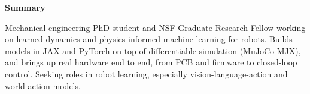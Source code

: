 \begin{center}
    \textbf{Summary}
\end{center}

Mechanical engineering PhD student and NSF Graduate Research Fellow working on learned dynamics and physics-informed machine learning for robots. Builds models in JAX and PyTorch on top of differentiable simulation (MuJoCo MJX), and brings up real hardware end to end, from PCB and firmware to closed-loop control. Seeking roles in robot learning, especially vision-language-action and world action models.
